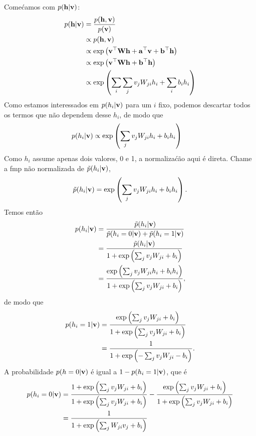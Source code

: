 \begin{exenumerate}
\begin{solution}
        Come\'camos com $p(\mathbf{h} | \mathbf{v})$:
        \begin{align}
            p(\mathbf{h} | \mathbf{v}) &= \frac{p(\mathbf{h},\mathbf{v})}{p(\mathbf{v})} \\
            & \propto p(\mathbf{h},\mathbf{v}) \\
            & \propto \exp\left( \mathbf{v}^\top \mathbf{W} \mathbf{h} + \mathbf{a}^\top\mathbf{v} + \mathbf{b}^\top\mathbf{h} \right)\\
            & \propto \exp\left( \mathbf{v}^\top \mathbf{W} \mathbf{h} + \mathbf{b}^\top\mathbf{h} \right)\\
            & \propto \exp\left( \sum_i \sum_j v_j W_{ji} h_i + \sum_i b_i h_i \right)
        \end{align}
        Como estamos interessados em $p(h_i | \mathbf{v})$ para um $i$ fixo, podemos descartar todos os termos que n\~ao dependem desse $h_i$, de modo que
        \begin{align}
            p(h_i | \mathbf{v}) & \propto \exp\left( \sum_j v_j W_{ji} h_i + b_i h_i \right)
        \end{align}
        Como $h_i$ assume apenas dois valores, 0 e 1, a normaliza\'c\~ao aqui \'e direta. Chame a fmp n\~ao normalizada de $\tilde{p}(h_i | \mathbf{v})$,
        \begin{equation}
            \tilde{p}(h_i | \mathbf{v}) = \exp\left( \sum_j v_j W_{ji} h_i + b_i h_i \right).
        \end{equation}
        Temos ent\~ao
        \begin{align}
            p(h_i | \mathbf{v}) &= \frac{\tilde{p}(h_i | \mathbf{v})} { \tilde{p}(h_i=0 | \mathbf{v}) + \tilde{p}(h_i =1 | \mathbf{v})}\\
            & = \frac{\tilde{p}(h_i | \mathbf{v})} { 1+  \exp\left( \sum_j v_j W_{ji} + b_i \right)}\\
            & = \frac{\exp\left( \sum_j v_j W_{ji} h_i + b_i h_i \right)}{ 1+  \exp\left( \sum_j v_j W_{ji} + b_i \right)},
        \end{align}
        de modo que
        \begin{align}
            p(h_i=1 | \mathbf{v}) & =  \frac{\exp\left( \sum_j v_j W_{ji} + b_i \right)}{ 1+  \exp\left( \sum_j v_j W_{ji} + b_i \right)}\\
            & =  \frac{1}{ 1+  \exp\left(- \sum_j v_j W_{ji} - b_i \right)}.
        \end{align}
        A probabilidade $p(h=0 | \mathbf{v})$ \'e igual a $1 -  p(h_i=1 | \mathbf{v})$, que \'e
        \begin{align}
            p(h_i =0 | \mathbf{v}) & =  \frac{1+ \exp\left( \sum_j v_j W_{ji} + b_i \right)}{ 1+  \exp\left( \sum_j v_j W_{ji} + b_i \right)} - \frac{\exp\left( \sum_j v_j W_{ji} + b_i \right)}{ 1+  \exp\left( \sum_j v_j W_{ji} + b_i \right)}\\
            & = \frac{1}{ 1+  \exp\left( \sum_j W_{ji} v_j + b_i \right)}
        \end{align}
        

\end{solution}
\end{exenumerate}
